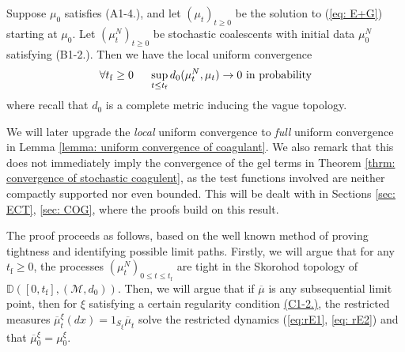 \begin{lemma}\label{lemma: local uniform convergence of stochastic coagulent}
Suppose $\mu_0$ satisfies ({A1}-{4.}), and let $(\mu_t)_{t\ge 0}$ be the solution to (\ref{eq: E+G}) starting at $\mu_0$. Let $(\mu^N_t)_{t\ge 0}$ be stochastic coalescents with initial data $\mu^N_0$ satisfying (B1-2.). Then we have the local uniform convergence
\begin{equation*}
\forall t_\mathrm{f}\ge 0 \hspace{0.5cm} \sup_{t\le t_\mathrm{f}} d_0(\mu^N_t, \mu_t)\rightarrow 0 \text{ in probability} 
\end{equation*} where recall that $d_0$ is a complete metric inducing the vague topology.
\end{lemma} \begin{remark}
We will later upgrade the \emph{local} uniform convergence to \emph{full} uniform convergence in Lemma \ref{lemma: uniform convergence of coagulant}. We also remark that this does not immediately imply the convergence of the gel terms in Theorem \ref{thrm: convergence of stochastic coagulent}, as the test functions involved are  neither compactly supported nor even bounded. This will be dealt with in Sections \ref{sec: ECT}, \ref{sec: COG}, where the proofs build on this result.
\end{remark}
The proof proceeds as follows, based on the well known method of proving tightness and identifying possible limit paths. Firstly, we will argue that for any $t_\mathrm{f}\ge 0$, the processes $(\mu^N_t)_{0\le t\le t_\mathrm{f}}$ are tight in the Skorohod topology of $\mathbb{D}([0,t_\mathrm{f}],(\mathcal{M},d_0))$.  Then, we will argue that if $\overline{\mu}$ is any subsequential limit point, then for $\xi$ satisfying a certain regularity condition \hyperref[eq: reg]{(C1-2.)}, the restricted measures $\overline{\mu}_t^\xi(dx)=1_{S_\xi}\overline{\mu}_t$ solve the restricted dynamics (\ref{eq:rE1}, \ref{eq: rE2}) and that $\overline{\mu}^\xi_0=\mu^\xi_0$.
